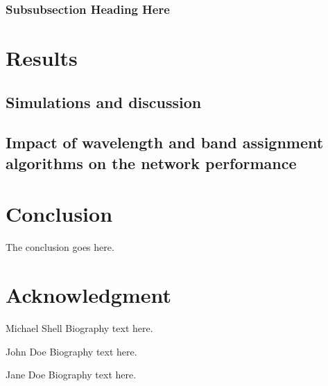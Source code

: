 \documentclass[journal,comsoc]{IEEEtran}
\begin{document}
\subsubsection{Subsubsection Heading Here}

\section{Results}

\subsection{Simulations and discussion}

\subsection{Impact of wavelength and band assignment algorithms on the network performance}

\section{Conclusion}
The conclusion goes here.

\appendices

\section*{Acknowledgment}

\ifCLASSOPTIONcaptionsoff
  \newpage
\fi




\begin{IEEEbiography}{Michael Shell}
Biography text here.
\end{IEEEbiography}

\begin{IEEEbiographynophoto}{John Doe}
Biography text here.
\end{IEEEbiographynophoto}

\begin{IEEEbiographynophoto}{Jane Doe}
Biography text here.
\end{IEEEbiographynophoto}
\end{document}
